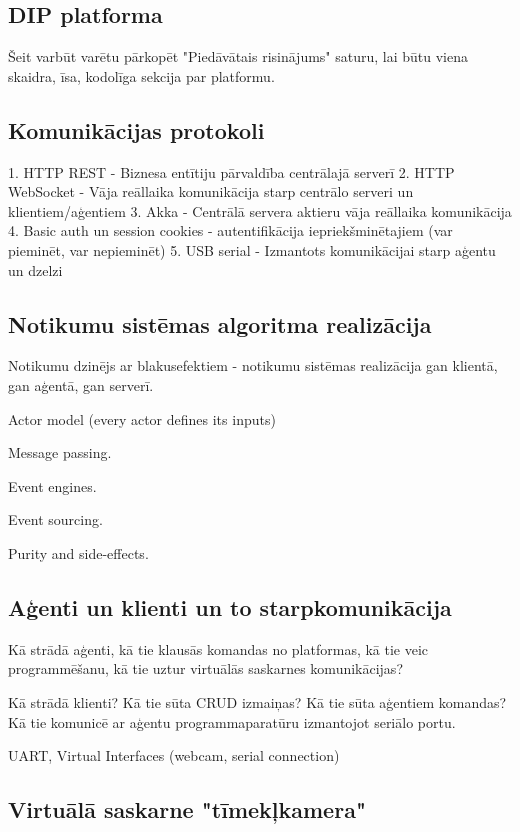 \subsection{DIP platforma}

Šeit varbūt varētu pārkopēt "Piedāvātais risinājums" saturu, lai būtu viena skaidra, īsa, kodolīga sekcija par platformu. 

\subsection{Komunikācijas protokoli}

1. HTTP REST - Biznesa entītiju pārvaldība centrālajā serverī
2. HTTP WebSocket - Vāja reāllaika komunikācija starp centrālo serveri un klientiem/aģentiem
3. Akka - Centrālā servera aktieru vāja reāllaika komunikācija
4. Basic auth un session cookies - autentifikācija iepriekšminētajiem (var pieminēt, var nepieminēt)
5. USB serial - Izmantots komunikācijai starp aģentu un dzelzi

\subsection{Notikumu sistēmas algoritma realizācija}

Notikumu dzinējs ar blakusefektiem - notikumu sistēmas realizācija gan klientā, gan aģentā, gan serverī.

Actor model (every actor defines its inputs)

Message passing.

Event engines.

Event sourcing.

Purity and side-effects.

\subsection{Aģenti un klienti un to starpkomunikācija}

Kā strādā aģenti, kā tie klausās komandas no platformas, kā tie veic programmēšanu,
kā tie uztur virtuālās saskarnes komunikācijas?

Kā strādā klienti? Kā tie sūta CRUD izmaiņas? Kā tie sūta aģentiem komandas? Kā tie
komunicē ar aģentu programmaparatūru izmantojot seriālo portu.

UART, Virtual Interfaces (webcam, serial connection)

\subsection{Virtuālā saskarne "tīmekļkamera"}

